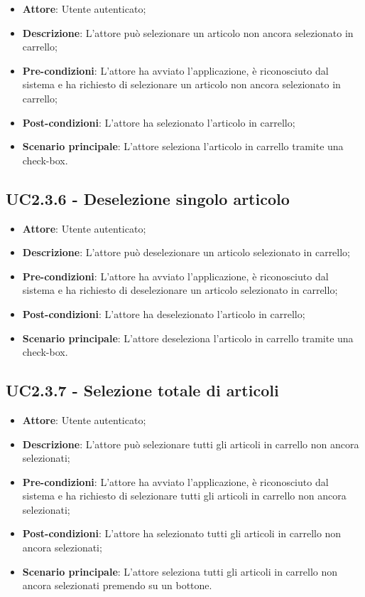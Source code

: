 \begin{itemize}
	\item \textbf{Attore}: Utente autenticato;
	\item \textbf{Descrizione}: L'attore può selezionare un articolo non ancora selezionato in carrello;
	\item \textbf{Pre-condizioni}: L'attore ha avviato l'applicazione, è riconosciuto dal sistema e ha richiesto di selezionare un articolo non ancora selezionato in carrello;
	\item \textbf{Post-condizioni}: L'attore ha selezionato l'articolo in carrello;
	\item \textbf{Scenario principale}: L'attore seleziona l'articolo in carrello tramite una check-box.
\end{itemize}

\subsection{UC2.3.6 - Deselezione singolo articolo}

\begin{itemize}
	\item \textbf{Attore}: Utente autenticato;
	\item \textbf{Descrizione}: L'attore può deselezionare un articolo selezionato in carrello;
	\item \textbf{Pre-condizioni}: L'attore ha avviato l'applicazione, è riconosciuto dal sistema e ha richiesto di deselezionare un articolo selezionato in carrello;
	\item \textbf{Post-condizioni}: L'attore ha deselezionato l'articolo in carrello;
	\item \textbf{Scenario principale}: L'attore deseleziona l'articolo in carrello tramite una check-box.
\end{itemize}

\subsection{UC2.3.7 - Selezione totale di articoli}

\begin{itemize}
	\item \textbf{Attore}: Utente autenticato;
	\item \textbf{Descrizione}: L'attore può selezionare tutti gli articoli in carrello non ancora selezionati;
	\item \textbf{Pre-condizioni}: L'attore ha avviato l'applicazione, è riconosciuto dal sistema e ha richiesto di selezionare tutti gli articoli in carrello non ancora selezionati;
	\item \textbf{Post-condizioni}: L'attore ha selezionato tutti gli articoli in carrello non ancora selezionati;
	\item \textbf{Scenario principale}: L'attore seleziona tutti gli articoli in carrello non ancora selezionati premendo su un bottone.
\end{itemize}

